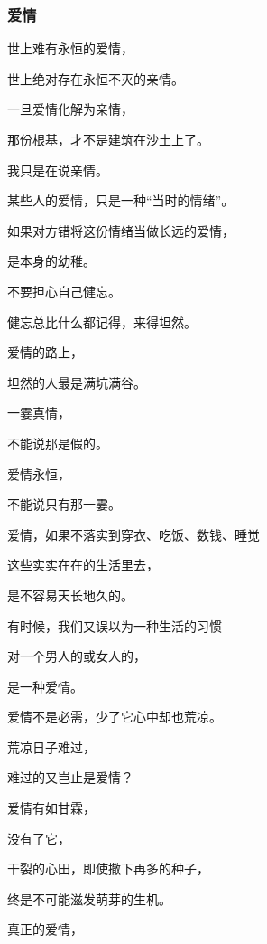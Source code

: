 \subsubsection{爱情}


\par 世上难有永恒的爱情，
\par 世上绝对存在永恒不灭的亲情。
\par 一旦爱情化解为亲情，
\par 那份根基，才不是建筑在沙土上了。
\par 我只是在说亲情。
\par 
\par 某些人的爱情，只是一种“当时的情绪”。
\par 如果对方错将这份情绪当做长远的爱情，
\par 是本身的幼稚。
\par 
\par 不要担心自己健忘。
\par 健忘总比什么都记得，来得坦然。
\par 爱情的路上，
\par 坦然的人最是满坑满谷。
\par 
\par 一霎真情，
\par 不能说那是假的。
\par 爱情永恒，
\par 不能说只有那一霎。
\par 
\par 爱情，如果不落实到穿衣、吃饭、数钱、睡觉
\par 这些实实在在的生活里去，
\par 是不容易天长地久的。
\par 
\par 有时候，我们又误以为一种生活的习惯——
\par 对一个男人的或女人的，
\par 是一种爱情。
\par 
\par 爱情不是必需，少了它心中却也荒凉。
\par 荒凉日子难过，
\par 难过的又岂止是爱情？
\par 
\par 爱情有如甘霖，
\par 没有了它，
\par 干裂的心田，即使撒下再多的种子，
\par 终是不可能滋发萌芽的生机。
\par 
\par 真正的爱情，
